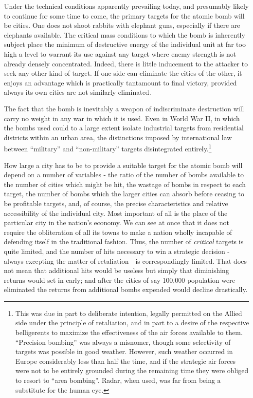 \label{I-SuperiorNos1}

Under the technical conditions apparently prevailing today, and presumably likely to continue for some time to come, the primary targets for the atomic bomb will be cities. One does not shoot rabbits with elephant guns, especially if there are elephants available. The critical mass conditions to which the bomb is inherently subject place the minimum of destructive energy of the individual unit at far too high a level to warrant its use against any target where enemy strength is not already densely concentrated. Indeed, there is little inducement to the attacker to seek any other kind of target. If one side can eliminate the cities of the other, it enjoys an advantage which is practically tantamount to final victory, provided always its own cities are not similarly eliminated.

The fact that the bomb is inevitably a weapon of indiscriminate destruction will carry no weight in any war in which it is used. Even in World War II, in which the bombs used could to a large extent isolate industrial targets from residential districts within an urban area, the distinctions imposed by international law between ``military'' and ``non-military'' targets disintegrated entirely.\footnote{This was due in part to deliberate intention, legally permitted on the Allied side under the principle of retaliation, and in part to a desire of the respective belligerents to maximize the effectiveness of the air forces available to them. ``Precision bombing'' was always a misnomer, though some selectivity of targets was possible in good weather. However, such weather occurred in Europe considerably less than half the time, and if the strategic air forces were not to be entirely grounded during the remaining time they were obliged to resort to ``area bombing''. Radar, when used, was far from being a substitute for the human eye.}

How large a city has to be to provide a suitable target for the atomic bomb will depend on a number of variables - the ratio of the number of bombs available to the number of cities which might be hit, the wastage of bombs in respect to each target, the number of bombs which the larger cities can absorb before ceasing to be profitable targets, and, of course, the precise characteristics and relative accessibility of the individual city. Most important of all is the place of the particular city in the nation's economy. We can see at once that it does not require the obliteration of all its towns to make a nation wholly incapable of defending itself in the traditional fashion. Thus, the number of \emph{critical} targets is quite limited, and the number of hits necessary to win a strategic decision - always excepting the matter of retaliation - is correspondingly limited. That does not mean that additional hits would be useless but simply that diminishing returns would set in early; and after the cities of say 100,000 population were eliminated the returns from additional bombs expended would decline drastically.

